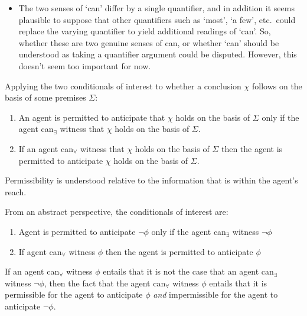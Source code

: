 \documentclass[10pt]{article}
\newcommand{\hozlinedash}[0]{%
  \noindent\hdashrule[0.5ex][c]{\textwidth}{.1pt}{2.5pt}
}
\begin{document}
\begin{itemize}
\item The two senses of `can' differ by a single quantifier, and in addition it seems plausible to suppose that other quantifiers such as `most', `a few', etc.\ could replace the varying quantifier to yield additional readings of `can'.
  So, whether these are two genuine senses of can, or whether `can' should be understood as taking a quantifier argument could be disputed.
  However, this doesn't seem too important for now.
\end{itemize}

\hozlinedash

Applying the two conditionals of interest to whether a conclusion \(\chi\) follows on the basis of some premises \(\Sigma\):

\begin{enumerate}[label=A\arabic*., ref=(A\arabic*)]
\item\label{basis:E} An agent is permitted to anticipate that \(\chi\) holds on the basis of \(\Sigma\) only if the agent can\(_{\exists}\) witness that \(\chi\) holds on the basis of \(\Sigma\).
\item\label{basis:A} If an agent can\(_{\forall}\) witness that \(\chi\) holds on the basis of \(\Sigma\) then the agent is permitted to anticipate \(\chi\) holds on the basis of \(\Sigma\).
\end{enumerate}

Permissibility is understood relative to the information that is within the agent's reach.

\hozlinedash

From an abstract perspective, the conditionals of interest are:

\begin{enumerate}
\item Agent is permitted to anticipate \(\lnot\phi\) only if the agent can\(_{\exists}\) witness \(\lnot\phi\)
\item If agent can\(_{\forall}\) witness \(\phi\) then the agent is permitted to anticipate \(\phi\)
\end{enumerate}

If an agent can\(_{\forall}\) witness \(\phi\) entails that it is not the case that an agent can\(_{\exists}\) witness \(\lnot\phi\), then the fact that the agent can\(_{\forall}\) witness \(\phi\) entails that it is permissible for the agent to anticipate \(\phi\) \emph{and} impermissible for the agent to anticipate \(\lnot\phi\).
\end{document}
